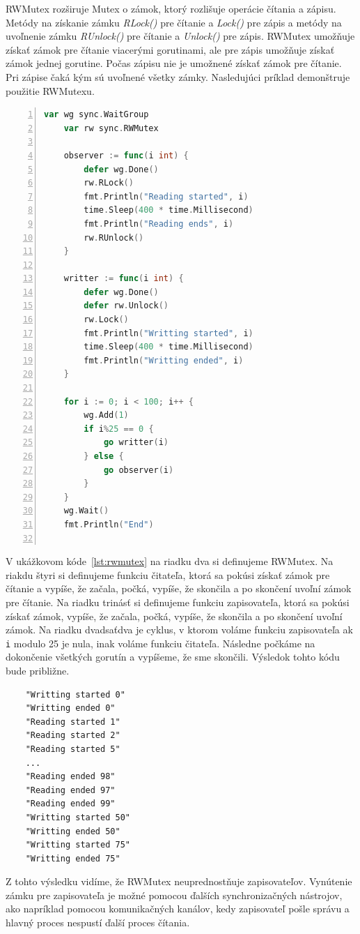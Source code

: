 \documentclass[
  biblatex,
  seconds=true,
  language=slovak,
  figures=false,
  urldate=iso,
  glossaries,
  index
]{kidiplom}
\begin{document}
RWMutex rozširuje Mutex o zámok, ktorý rozlišuje operácie čítania a zápisu. Metódy na získanie zámku \emph{RLock()} pre čítanie a \emph{Lock()} pre zápis a
metódy na uvoľnenie zámku \emph{RUnlock()} pre čítanie a \emph{Unlock()} pre zápis. RWMutex umožňuje získať zámok pre čítanie viacerými gorutinami,
ale pre zápis umožňuje získať zámok jednej gorutine. Počas zápisu nie je umožnené získať zámok pre čítanie. Pri zápise čaká kým sú uvoľnené
všetky zámky. Nasledujúci príklad demonštruje použitie RWMutexu.
\newpage
\begin{lstlisting}[language=Go, numbers=left, caption={Použitie RWMutex}, captionpos=b, label={lst:rwmutex}]
    var wg sync.WaitGroup
	var rw sync.RWMutex

	observer := func(i int) {
		defer wg.Done()
		rw.RLock()
		fmt.Println("Reading started", i)
		time.Sleep(400 * time.Millisecond)
		fmt.Println("Reading ends", i)
		rw.RUnlock()
	}

	writter := func(i int) {
		defer wg.Done()
		defer rw.Unlock()
		rw.Lock()
		fmt.Println("Writting started", i)
		time.Sleep(400 * time.Millisecond)
		fmt.Println("Writting ended", i)
	}

	for i := 0; i < 100; i++ {
		wg.Add(1)
		if i%25 == 0 {
			go writter(i)
		} else {
			go observer(i)
		}
	}
	wg.Wait()
	fmt.Println("End")
    
\end{lstlisting}
V ukážkovom kóde~\ref{lst:rwmutex} na riadku dva si definujeme RWMutex. Na riakdu štyri si definujeme funkciu čitateľa, ktorá sa pokúsi získať zámok pre čítanie a
vypíše, že začala, počká, vypíše, že skončila a po skončení uvoľní zámok pre čítanie.
Na riadku trinásť si definujeme funkciu zapisovateľa, ktorá sa pokúsi získať zámok, vypíše, že začala, počká, vypíše, že skončila
a po skončení uvoľní zámok.
Na riadku dvadsaťdva je cyklus, v ktorom voláme funkciu zapisovateľa ak \texttt{i} modulo 25 je nula, inak voláme funkciu čitateľa.
Následne počkáme na dokončenie všetkých gorutín a vypíšeme, že sme skončili. Výsledok tohto kódu bude približne.
\newpage
\begin{lstlisting}
    "Writting started 0"
    "Writting ended 0"
    "Reading started 1"
    "Reading started 2"
    "Reading started 5"
    ...
    "Reading ended 98"
    "Reading ended 97"
    "Reading ended 99"
    "Writting started 50"
    "Writting ended 50"
    "Writting started 75"
    "Writting ended 75"
\end{lstlisting}
Z tohto výsledku vidíme, že RWMutex neuprednostňuje zapisovateľov. Vynútenie zámku pre zapisovateľa je možné pomocou ďalších
synchronizačných nástrojov, ako napríklad pomocou komunikačných kanálov, kedy zapisovateľ pošle správu a hlavný proces nespustí ďalší proces čítania.
\end{document}
